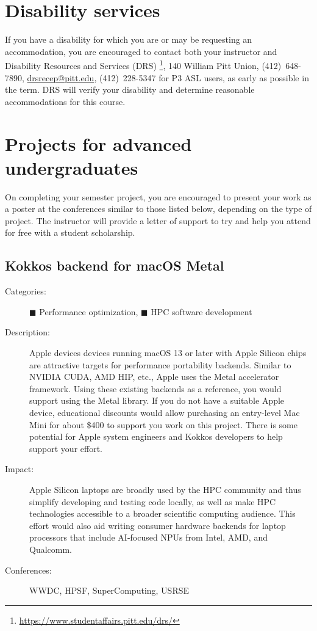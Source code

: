 \documentclass[12pt]{article}
\begin{document}
\section{Disability services}

If you have a disability %
for which you are or may be requesting an accommodation, %
you are encouraged to contact %
both your instructor and Disability Resources and Services (DRS)%
\footnote{\url{https://www.studentaffairs.pitt.edu/drs/}}, %
140 William Pitt Union, %
(412)~648-7890, %
\href{mailto:drsrecep@pitt.edu}{drsrecep@pitt.edu}, %
(412)~228-5347 for P3 ASL users, %
as early as possible in the term.
%
DRS will verify your disability %
and determine reasonable accommodations for this course.

\appendix

\section{Projects for advanced undergraduates}
\label{sec:projects}

On completing your semester project, %
you are encouraged to present your work as a poster %
at the conferences similar to those listed below, %
depending on the type of project.
%
The instructor will provide a letter of support %
to try and help you attend for free with a student scholarship.

\subsection{Kokkos backend for macOS Metal}
\begin{description}
\item[Categories:]
  \textcolor{orange!90!black}{$\blacksquare$} Performance optimization,
  \textcolor{blue!80!black}{$\blacksquare$} HPC software development
\item[Description:] Apple devices devices running macOS 13 or later %
  with Apple Silicon chips %
  are attractive targets for performance portability backends.
  Similar to NVIDIA CUDA, AMD HIP, etc., %
  Apple uses the Metal accelerator framework.
  Using these existing backends as a reference, %
  you would support using the Metal library.
  If you do not have a suitable Apple device, %
  educational discounts would allow purchasing %
  an entry-level Mac Mini for about \$400 %
  to support you work on this project.
  There is some potential for Apple system engineers %
  and Kokkos developers to help support your effort.
\item[Impact:] Apple Silicon laptops are broadly used by the HPC community %
  and thus simplify developing and testing code locally,
  as well as make HPC technologies %
  accessible to a broader scientific computing audience.
  This effort would also aid writing consumer hardware backends %
  for laptop processors that include AI-focused NPUs %
  from Intel, AMD, and Qualcomm.
\item[Conferences:] WWDC, HPSF, SuperComputing, USRSE
\end{description}
\end{document}
